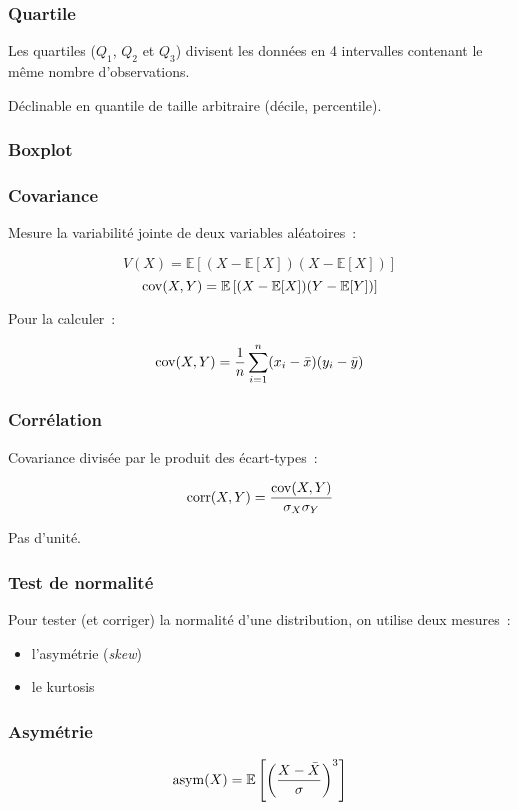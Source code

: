 \documentclass{formation}
\begin{document}
\begin{frame}[fragile]
  \frametitle{Quartile}

  Les quartiles ($Q_1$, $Q_2$ et $Q_3$) divisent les données en 4
  intervalles contenant le même nombre d'observations.

  Déclinable en quantile de taille arbitraire (décile, percentile).

  \pause {}
\end{frame}

\begin{frame}[fragile]
  \frametitle{Boxplot}

\end{frame}

\begin{frame}[fragile]
  \frametitle{Covariance}
  Mesure la variabilité jointe de deux variables aléatoires :

  \[
    V(X) = \mathbb{E}\left[(X - \mathbb{E}[X])(X - \mathbb{E}[X])\right]
  \]
  \[
    \cov(X, Y) = \mathbb{E}\left[(X - \mathbb{E}[X])(Y - \mathbb{E}[Y])\right]
  \]

  Pour la calculer :

  \[
    \cov(X, Y) = \frac{1}{n}\sum_{i = 1}^{n}(x_i - \bar{x})(y_i - \bar{y})
  \]
\end{frame}

\begin{frame}[fragile]
  \frametitle{Corrélation}
  Covariance divisée par le produit des écart-types :

  \[
    \corr(X, Y) = \frac{\cov(X, Y)}{\sigma_X\sigma_Y}
  \]

   \pause Pas d'unité.
\end{frame}

\begin{frame}
  \frametitle{Test de normalité}

  Pour tester (et corriger) la normalité d'une distribution, on
  utilise deux mesures :

  \begin{itemize}
  \item l'asymétrie (\textit{skew})
  \item le kurtosis
  \end{itemize}
\end{frame}

\begin{frame}
  \frametitle{Asymétrie}


  \[
    \asym(X) = \mathbb{E} \left[\left(\frac{X - \bar{X}}{\sigma}\right)^3\right]
  \]
\end{frame}
\end{document}
